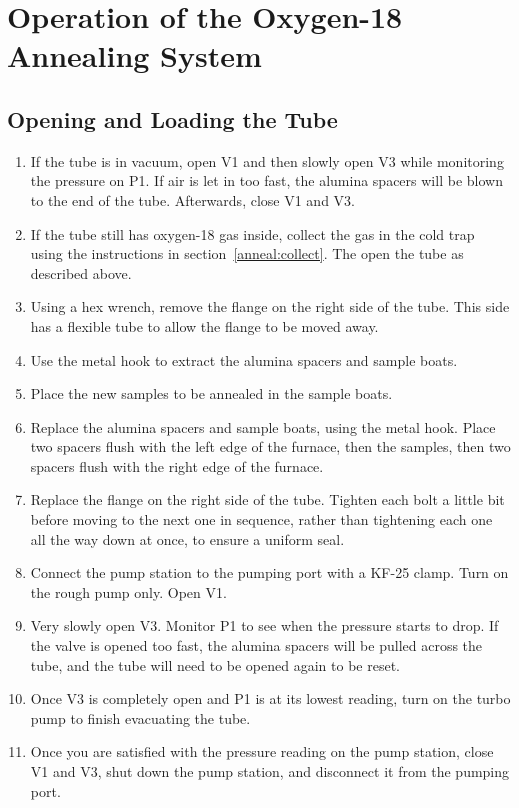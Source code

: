 \documentclass{thesis-umich}
\begin{document}
\chapter{Operation of the Oxygen-18 Annealing System}


\section{Opening and Loading the Tube}
\begin{enumerate}
	\item If the tube is in vacuum, open V1 and then slowly open V3 while monitoring the pressure on P1. If air is let in too fast, the alumina spacers will be blown to the end of the tube. Afterwards, close V1 and V3.
	\item If the tube still has oxygen-18 gas inside, collect the gas in the cold trap using the instructions in section~\ref{anneal:collect}. The open the tube as described above.
	\item Using a hex wrench, remove the flange on the right side of the tube. This side has a flexible tube to allow the flange to be moved away.
	\item Use the metal hook to extract the alumina spacers and sample boats.
	\item Place the new samples to be annealed in the sample boats.
	\item Replace the alumina spacers and sample boats, using the metal hook. Place two spacers flush with the left edge of the furnace, then the samples, then two spacers flush with the right edge of the furnace.
	\item Replace the flange on the right side of the tube. Tighten each bolt a little bit before moving to the next one in sequence, rather than tightening each one all the way down at once, to ensure a uniform seal. 
	\item Connect the pump station to the pumping port with a KF-25 clamp. Turn on the rough pump only. Open V1.
	\item Very slowly open V3. Monitor P1 to see when the pressure starts to drop. If the valve is opened too fast, the alumina spacers will be pulled across the tube, and the tube will need to be opened again to be reset.
	\item Once V3 is completely open and P1 is at its lowest reading, turn on the turbo pump to finish evacuating the tube.
	\item Once you are satisfied with the pressure reading on the pump station, close V1 and V3, shut down the pump station, and disconnect it from the pumping port.
\end{enumerate}
\end{document}
